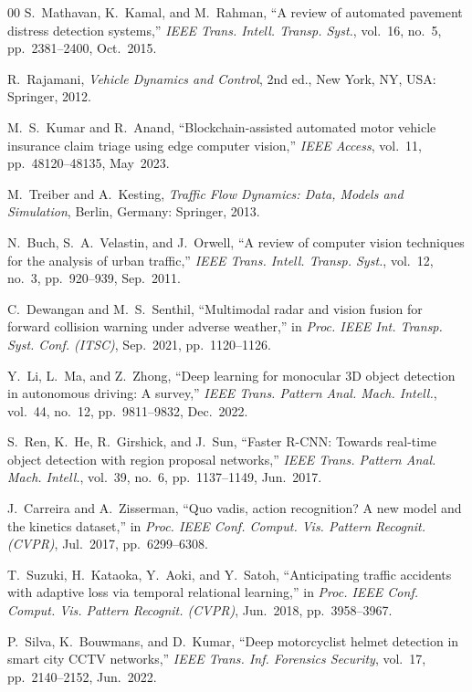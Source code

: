 \documentclass[journal,compsoc]{IEEEtran}
\begin{document}
\begin{thebibliography}{00}
S.~Mathavan, K.~Kamal, and M.~Rahman, ``A review of automated pavement distress detection systems,'' \textit{IEEE Trans. Intell. Transp. Syst.}, vol.~16, no.~5, pp.~2381--2400, Oct.~2015.

R.~Rajamani, \textit{Vehicle Dynamics and Control}, 2nd ed., New York, NY, USA: Springer, 2012.

M.~S.~Kumar and R.~Anand, ``Blockchain-assisted automated motor vehicle insurance claim triage using edge computer vision,'' \textit{IEEE Access}, vol.~11, pp.~48120--48135, May~2023.

M.~Treiber and A.~Kesting, \textit{Traffic Flow Dynamics: Data, Models and Simulation}, Berlin, Germany: Springer, 2013.

N.~Buch, S.~A.~Velastin, and J.~Orwell, ``A review of computer vision techniques for the analysis of urban traffic,'' \textit{IEEE Trans. Intell. Transp. Syst.}, vol.~12, no.~3, pp.~920--939, Sep.~2011.

C.~Dewangan and M.~S.~Senthil, ``Multimodal radar and vision fusion for forward collision warning under adverse weather,'' in \textit{Proc. IEEE Int. Transp. Syst. Conf. (ITSC)}, Sep.~2021, pp.~1120--1126.

Y.~Li, L.~Ma, and Z.~Zhong, ``Deep learning for monocular 3D object detection in autonomous driving: A survey,'' \textit{IEEE Trans. Pattern Anal. Mach. Intell.}, vol.~44, no.~12, pp.~9811--9832, Dec.~2022.

S.~Ren, K.~He, R.~Girshick, and J.~Sun, ``Faster R-CNN: Towards real-time object detection with region proposal networks,'' \textit{IEEE Trans. Pattern Anal. Mach. Intell.}, vol.~39, no.~6, pp.~1137--1149, Jun.~2017.

J.~Carreira and A.~Zisserman, ``Quo vadis, action recognition? A new model and the kinetics dataset,'' in \textit{Proc. IEEE Conf. Comput. Vis. Pattern Recognit. (CVPR)}, Jul.~2017, pp.~6299--6308.

T.~Suzuki, H.~Kataoka, Y.~Aoki, and Y.~Satoh, ``Anticipating traffic accidents with adaptive loss via temporal relational learning,'' in \textit{Proc. IEEE Conf. Comput. Vis. Pattern Recognit. (CVPR)}, Jun.~2018, pp.~3958--3967.

P.~Silva, K.~Bouwmans, and D.~Kumar, ``Deep motorcyclist helmet detection in smart city CCTV networks,'' \textit{IEEE Trans. Inf. Forensics Security}, vol.~17, pp.~2140--2152, Jun.~2022.


\end{thebibliography}
\end{document}
